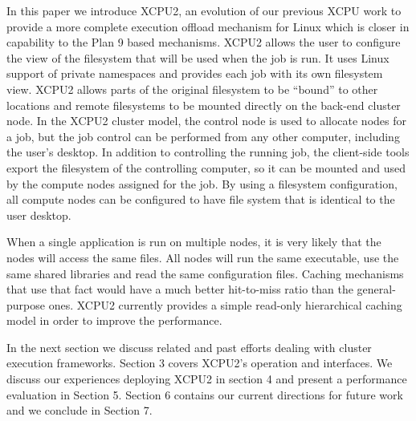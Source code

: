 In this paper we introduce XCPU2, an evolution of our previous
XCPU work to provide a more complete execution offload mechanism
for Linux which is closer in capability to the Plan 9 based mechanisms.
XCPU2 allows the user to configure the view of the filesystem that will be
used when the job is run. It uses Linux support of private namespaces and
provides each job with its own filesystem view. XCPU2 allows parts of the
original filesystem to be ``bound'' to other locations and remote filesystems
to be mounted directly on the back-end cluster node. 
In the XCPU2 cluster model, the control node is used to
allocate nodes for a job, but the job control can be performed from any
other computer, including the user's desktop. In addition to controlling the
running job, the client-side tools export the filesystem of the controlling
computer, so it can be mounted and used by the compute nodes assigned for
the job. By using a filesystem configuration, all compute nodes can be
configured to have file system that is identical to the user desktop.

When a single application is run on multiple nodes, it is very likely that
the nodes will access the same files. All nodes will run the same
executable, use the same shared libraries and read the same configuration
files. Caching mechanisms that use that fact would have a much better
hit-to-miss ratio than the general-purpose ones. XCPU2 currently provides a
simple read-only hierarchical caching model in order to improve the performance.

In the next section we discuss related and past efforts dealing with cluster
execution frameworks.  Section 3 covers XCPU2's operation and interfaces.
We discuss our experiences deploying XCPU2 in section 4 and present a
performance evaluation in Section 5.  Section 6 contains our current
directions for future work and we conclude in Section 7.
